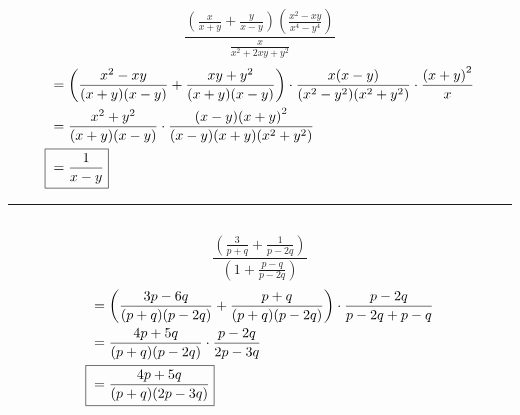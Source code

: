 	\subsection{}
		\[\frac{\left(\frac{x}{x + y} + \frac{y}{x - y}\right)\left(\frac{x^2 - xy}{x^4 - y^4}\right)}{\frac{x}{x^2 + 2xy + y^2}}\]
		\begin{align*}
			&= \left(\frac{x^2 - xy}{(x + y)(x - y)} + \frac{xy + y^2}{(x + y)(x - y)}\right) \cdot \frac{x(x - y)}{(x^2 - y^2)(x^2 + y^2)} \cdot \frac{{(x + y)}^2}{x} \\
			&= \frac{x^2 + y^2}{(x + y)(x - y)} \cdot \frac{(x - y){(x + y)}^2}{(x - y)(x + y)(x^2 + y^2)} \\
			\Aboxed{{} &= \frac{1}{x - y}}
		\end{align*}
		\hrule{}

	\subsection{}
		\[\frac{\left(\frac{3}{p + q} + \frac{1}{p - 2q}\right)}{\left(1 + \frac{p - q}{p - 2q}\right)}\]
		\begin{align*}
			&= \left(\frac{3p - 6q}{(p + q)(p - 2q)} + \frac{p + q}{(p + q)(p - 2q)}\right) \cdot \frac{p - 2q}{p - 2q + p - q} \\
			&= \frac{4p + 5q}{(p + q)(p - 2q)} \cdot \frac{p - 2q}{2p - 3q} \\
			\Aboxed{{} &= \frac{4p + 5q}{(p + q)(2p - 3q)}}
		\end{align*}

	\pagebreak{}
